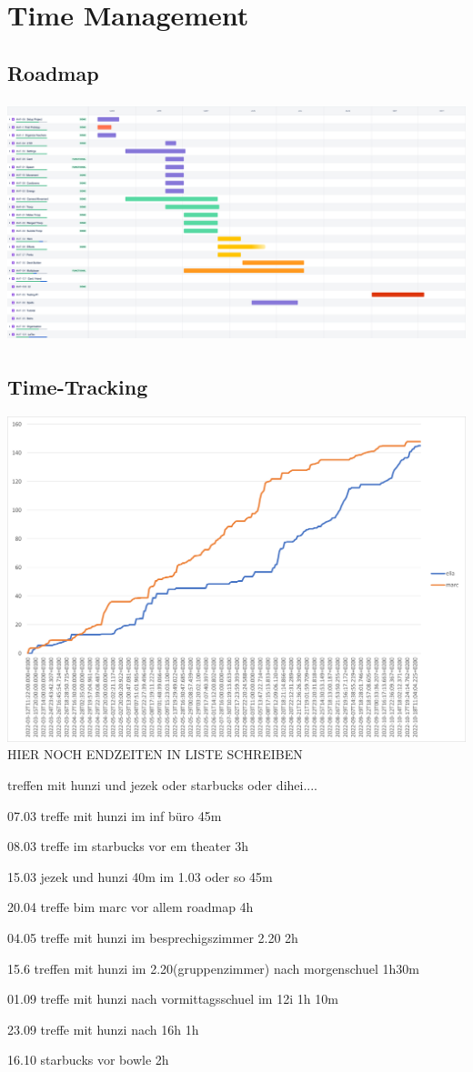 \chapter{Time Management}

\section{Roadmap}
\includegraphics[height=7cm]{resources/Roadmap.png}\\

\section{Time-Tracking}
\includegraphics*[width=15cm]{resources/graph.png}\\


HIER NOCH ENDZEITEN IN LISTE SCHREIBEN


treffen mit hunzi und jezek oder starbucks oder dihei....

07.03 treffe mit hunzi im inf büro 45m

08.03 treffe im starbucks vor em theater 3h

15.03 jezek und hunzi 40m im 1.03 oder so 45m

20.04 treffe bim marc vor allem roadmap 4h

04.05 treffe mit hunzi im besprechigszimmer 2.20 2h

15.6 treffen mit hunzi im 2.20(gruppenzimmer) nach morgenschuel 1h30m

01.09 treffe mit hunzi nach vormittagsschuel im 12i 1h 10m

23.09 treffe mit hunzi nach 16h 1h

16.10 starbucks vor bowle 2h

